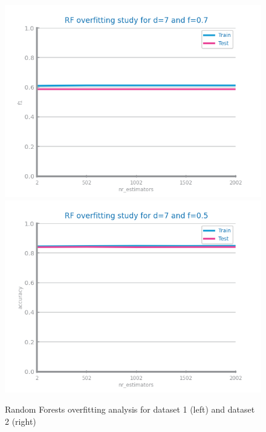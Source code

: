 \documentclass[10pt]{extarticle}
\begin{document}
\begin{figure}[H]
\centering\includegraphics[scale=0.95]{images/dataset1/models_evaluation/CovidPos_rf_f1_overfitting.png}
\includegraphics[scale=0.95]{images/dataset2/models_evaluation/Credit_Score_rf_accuracy_overfitting.png}
\caption{Random Forests overfitting analysis for dataset 1 (left) and dataset 2 (right)}
\end{figure}
\end{document}
